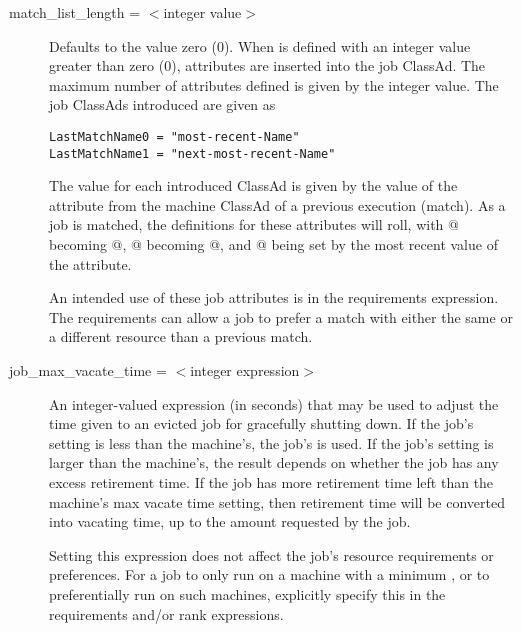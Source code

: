 \begin{description}

\label{condor-submit-match-list-length}
\item[match\_list\_length = $<$integer value$>$]
Defaults to the value zero (0).
When  is defined with an integer value
greater than zero (0),
attributes are inserted into the job ClassAd.
The maximum number of attributes defined is given by the integer
value.
The job ClassAds introduced are given as
\begin{verbatim}
LastMatchName0 = "most-recent-Name"
LastMatchName1 = "next-most-recent-Name"
\end{verbatim}

The value for each introduced ClassAd is given by the
value of the  attribute
from the machine ClassAd of a previous execution (match).
As a job is matched, the definitions for these attributes
will roll,
with @ becoming @,
@ becoming @,
and @ being set by the most recent
value of the  attribute.

An intended use of
these job attributes is in the requirements expression.
The requirements can allow a job to prefer a match with either the same
or a different resource than a previous match.


\label{condor-submit-job-max-vacate-time}
\item[job\_max\_vacate\_time = $<$integer expression$>$]
An integer-valued expression (in seconds) that may be used to adjust
the time given to an evicted job for gracefully shutting down.  If the
job's setting is less than the machine's, the job's is used.  If the
job's setting is larger than the machine's, the result depends on
whether the job has any excess retirement time.  If the job has more
retirement time left than the machine's max vacate time setting, then
retirement time will be converted into vacating time, up to the amount
requested by the job.

Setting this expression does not affect the job's resource
requirements or preferences.  For a job to only run on a machine with
a minimum , or to preferentially run on
such machines, explicitly specify this in the requirements and/or rank
expressions.


\end{description}
